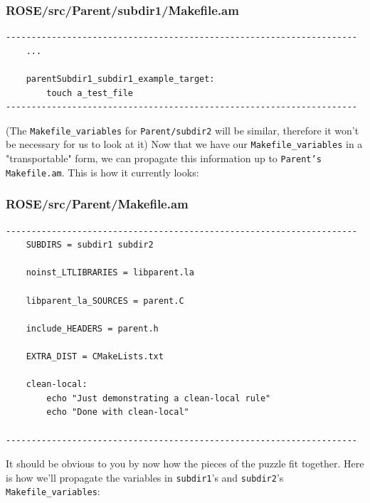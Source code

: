 \subsubsection{ROSE/src/Parent/subdir1/Makefile.am}
    \begin{verbatim}
---------------------------------------------------------------------
    ...

    parentSubdir1_subdir1_example_target:
        touch a_test_file
---------------------------------------------------------------------
    \end{verbatim}
(The \texttt{Makefile\_variables} for \texttt{Parent/subdir2} will be similar, therefore
it won't be necessary for us to look at it)
\newline\newline
Now that we have our \texttt{Makefile\_variables} in a "transportable" form, we can
propagate this information up to \texttt{Parent's Makefile.am}. This is how it currently
looks:

\subsubsection{ROSE/src/Parent/Makefile.am}
    \begin{verbatim}
---------------------------------------------------------------------
    SUBDIRS = subdir1 subdir2

    noinst_LTLIBRARIES = libparent.la

    libparent_la_SOURCES = parent.C

    include_HEADERS = parent.h

    EXTRA_DIST = CMakeLists.txt

    clean-local:
        echo "Just demonstrating a clean-local rule"
        echo "Done with clean-local"

---------------------------------------------------------------------
    \end{verbatim}
It should be obvious to you by now how the pieces of the puzzle fit together. Here is how
we'll propagate the variables in \texttt{subdir1}'s and \texttt{subdir2}'s
\texttt{Makefile\_variables}:

